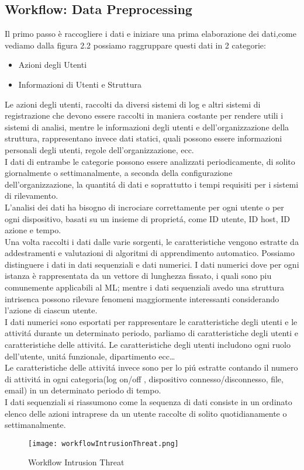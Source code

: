 \documentclass[../tesi.tex]{subfiles}
\begin{document}
\subsection{Workflow: Data Preprocessing}
Il primo passo è raccogliere i dati e iniziare una prima elaborazione dei dati,come vediamo dalla figura 2.2 possiamo raggruppare questi dati in 2 categorie: 
\begin{itemize}
\item Azioni degli Utenti
\item  Informazioni di Utenti e Struttura
\end{itemize}
 Le azioni degli utenti, raccolti da diversi sistemi di log e altri sistemi di registrazione che devono essere raccolti in maniera costante per rendere utili i sistemi di analisi, mentre le informazioni degli utenti e dell’organizzazione della struttura, rappresentano invece dati statici, quali possono essere informazioni personali degli utenti, regole dell’organizzazione, ecc.\\
I dati di entrambe le categorie possono essere analizzati periodicamente, di solito giornalmente o settimanalmente, a seconda della configurazione dell’organizzazione, la quantitá di dati e soprattutto i tempi requisiti per i sistemi di rilevamento.\\
L’analisi dei dati ha bisogno di incrociare correttamente per ogni utente o per ogni dispositivo, basati su un insieme di proprietá, come ID utente, ID host, ID azione e tempo.\\
Una volta raccolti i dati dalle varie sorgenti, le caratteristiche vengono estratte da addestramenti e valutazioni di algoritmi di apprendimento automatico.
Possiamo distinguere i dati in dati sequenziali e dati numerici. I dati numerici dove per ogni istanza è rappresentata da un vettore di lunghezza fissato, i quali sono piu comunemente applicabili al ML; mentre i dati sequenziali avedo una struttura intrisenca possono rilevare fenomeni maggiormente interessanti considerando l’azione di ciascun utente.\\
I dati numerici sono esportati per rappresentare le caratteristiche degli utenti e le attivitá durante un determinato periodo, parliamo di caratteristiche degli utenti e caratteristiche delle attivitá.
Le caratteristiche degli utenti includono ogni ruolo dell’utente, unitá funzionale, dipartimento ecc…\\
Le caratteristiche delle attivitá invece sono per lo piú estratte contando il numero di attivitá in ogni categoria(log on/off , dispositivo connesso/disconnesso, file, email) in un determinato periodo di tempo.\\
I dati sequenziali si riassumono come la sequenza di dati consiste in un ordinato elenco delle azioni intraprese da un utente raccolte di solito quotidianamente o settimanalmente.\\
\begin{figure}[htbp]
\center
\texttt{[image: workflowIntrusionThreat.png]}
\caption{Workflow Intrusion Threat} 
\end{figure}
\newpage
\end{document}
